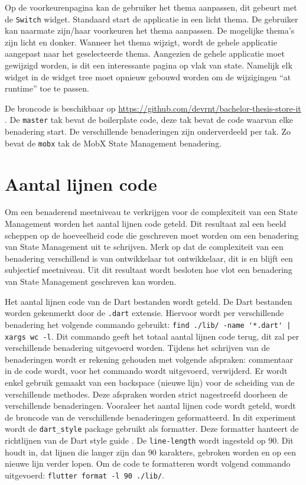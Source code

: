Op de voorkeurenpagina kan de gebruiker het thema aanpassen, dit gebeurt met de \verb|Switch| widget. Standaard start de applicatie in een licht thema. De gebruiker kan naarmate zijn/haar voorkeuren het thema aanpassen. De mogelijke thema's zijn licht en donker.
Wanneer het thema wijzigt, wordt de gehele applicatie aangepast naar het geselecteerde thema. Aangezien de gehele applicatie moet gewijzigd worden, is dit een interessante pagina op vlak van state. Namelijk elk widget in de widget tree moet opnieuw gebouwd worden om de wijzigingen ``at runtime'' toe te passen.


De broncode is beschikbaar op \url{https://github.com/devrnt/bachelor-thesis-store-it} \autocite{DeVrient2019}. De \verb|master| tak bevat de boilerplate code, deze tak bevat de code waarvan elke benadering start. De verschillende benaderingen zijn onderverdeeld per tak. Zo bevat de \verb|mobx| tak de MobX State Management benadering.

\section{Aantal lijnen code}
\label{ch:loc}
Om een benaderend meetniveau te verkrijgen voor de complexiteit van een State Management worden het aantal lijnen code geteld. Dit resultaat zal een beeld scheppen op de hoeveelheid code die geschreven moet worden om een benadering van State Management uit te schrijven. Merk op dat de complexiteit van een benadering verschillend is van ontwikkelaar tot ontwikkelaar, dit is en blijft een subjectief meetniveau. Uit dit resultaat wordt besloten hoe vlot een benadering van State Management geschreven kan worden.  

Het aantal lijnen code van de Dart bestanden wordt geteld. De Dart bestanden worden gekenmerkt door de \verb|.dart| extensie. Hiervoor wordt per verschillende benadering het volgende commando gebruikt: \verb=find ./lib/ -name '*.dart' | xargs wc -l=. Dit commando geeft het totaal aantal lijnen code terug, dit zal per verschillende benadering uitgevoerd worden. \newline 
Tijdens het schrijven van de benaderingen wordt er rekening gehouden met volgende afspraken: commentaar in de code wordt, voor het commando wordt uitgevoerd, verwijderd. Er wordt enkel gebruik gemaakt van een backspace (nieuwe lijn) voor de scheiding van de verschillende methodes. Deze afspraken worden strict nagestreefd doorheen de verschillende benaderingen. \newline
\newline
Vooraleer het aantal lijnen code wordt geteld, wordt de broncode van de verschillende benaderingen geformatteerd. In dit experiment wordt de \verb|dart_style| package gebruikt als formatter. Deze formatter hanteert de richtlijnen van de Dart style guide \autocite{Dart2019a}. De \verb|line-length| wordt ingesteld op 90. Dit houdt in, dat lijnen die langer zijn dan 90 karakters, gebroken worden en op een nieuwe lijn verder lopen. Om de code te formatteren wordt volgend commando uitgevoerd: \verb|flutter format -l 90 ./lib/|.


